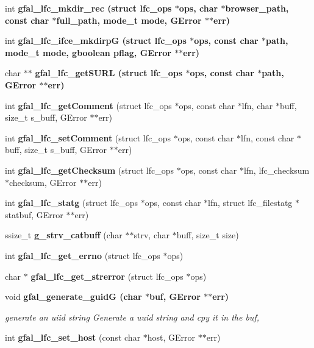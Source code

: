 \begin{CompactItemize}
\item 
int \bf{gfal\_\-lfc\_\-mkdir\_\-rec} (struct lfc\_\-ops $\ast$ops, char $\ast$browser\_\-path, const char $\ast$full\_\-path, mode\_\-t mode, GError $\ast$$\ast$err)
\item 
int \bf{gfal\_\-lfc\_\-ifce\_\-mkdirp\-G} (struct lfc\_\-ops $\ast$ops, const char $\ast$path, mode\_\-t mode, gboolean pflag, GError $\ast$$\ast$err)
\item 
char $\ast$$\ast$ \bf{gfal\_\-lfc\_\-get\-SURL} (struct lfc\_\-ops $\ast$ops, const char $\ast$path, GError $\ast$$\ast$err)
\item 
int \textbf{gfal\_\-lfc\_\-get\-Comment} (struct lfc\_\-ops $\ast$ops, const char $\ast$lfn, char $\ast$buff, size\_\-t s\_\-buff, GError $\ast$$\ast$err)\label{lfc__ifce__ng_8c_71ac937c7262a53247ea1b204ae23c6c}

\item 
int \textbf{gfal\_\-lfc\_\-set\-Comment} (struct lfc\_\-ops $\ast$ops, const char $\ast$lfn, const char $\ast$buff, size\_\-t s\_\-buff, GError $\ast$$\ast$err)\label{lfc__ifce__ng_8c_0b9952562acf59969aefc9519956f877}

\item 
int \textbf{gfal\_\-lfc\_\-get\-Checksum} (struct lfc\_\-ops $\ast$ops, const char $\ast$lfn, lfc\_\-checksum $\ast$checksum, GError $\ast$$\ast$err)\label{lfc__ifce__ng_8c_3285a6a2cf6d76aa8fadabaee79f7896}

\item 
int \textbf{gfal\_\-lfc\_\-statg} (struct lfc\_\-ops $\ast$ops, const char $\ast$lfn, struct lfc\_\-filestatg $\ast$statbuf, GError $\ast$$\ast$err)\label{lfc__ifce__ng_8c_220714510c3f197e656ddea9f04ffec3}

\item 
ssize\_\-t \textbf{g\_\-strv\_\-catbuff} (char $\ast$$\ast$strv, char $\ast$buff, size\_\-t size)\label{lfc__ifce__ng_8c_bc04cd8d7342170700f02f6297fc4105}

\item 
int \textbf{gfal\_\-lfc\_\-get\_\-errno} (struct lfc\_\-ops $\ast$ops)\label{lfc__ifce__ng_8c_caa53981228e722b2175cfd7b4ca051c}

\item 
char $\ast$ \textbf{gfal\_\-lfc\_\-get\_\-strerror} (struct lfc\_\-ops $\ast$ops)\label{lfc__ifce__ng_8c_58172b62403dfd7a7b742548f074cd44}

\item 
void \bf{gfal\_\-generate\_\-guid\-G} (char $\ast$buf, GError $\ast$$\ast$err)
\begin{CompactList}\small\item\em generate an uiid string Generate a uuid string and cpy it in the buf, \item\end{CompactList}\item 
int \textbf{gfal\_\-lfc\_\-set\_\-host} (const char $\ast$host, GError $\ast$$\ast$err)\label{lfc__ifce__ng_8c_8d1fdb84029a45d15dcd460c648f0fbc}

\end{CompactItemize}


